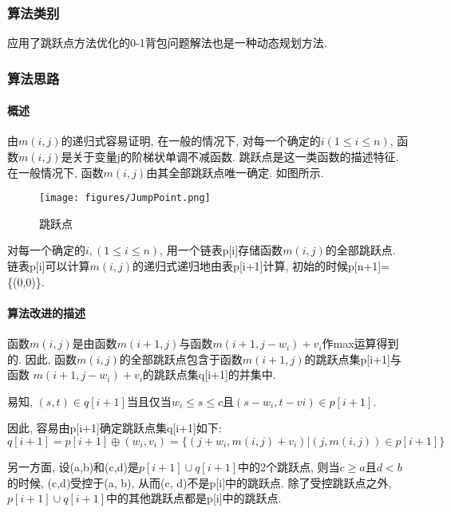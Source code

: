 \subsubsection{算法类别}
应用了跳跃点方法优化的0-1背包问题解法也是一种动态规划方法.

\subsubsection{算法思路}
\label{sec:jumpPointThink}
\paragraph{概述}
由$m(i, j)$的递归式容易证明, 在一般的情况下, 对每一个确定的$i(1\leq i\leq n)$,
函数$m(i, j)$是关于变量j的阶梯状单调不减函数. 跳跃点是这一类函数的描述特征.
在一般情况下, 函数$m(i, j)$由其全部跳跃点唯一确定. 如图所示.

\begin{figure}[ht!]
	\centering
	\texttt{[image: figures/JumpPoint.png]}
	\caption{跳跃点}
	\label{fig:JumpPoint}
\end{figure}

对每一个确定的$i,(1\leq i\leq n)$, 用一个链表p[i]存储函数$m(i,j)$的全部跳跃点.
链表p[i]可以计算$m(i,j)$的递归式递归地由表p[i+1]计算,
初始的时候p[n+1]=\{(0,0)\}.

\paragraph{算法改进的描述}
函数$m(i,j)$是由函数$m(i+1,j)$与函数$m(i+1, j-w_i)+v_i$作max运算得到的. 因此,
函数$m(i,j)$的全部跳跃点包含于函数$m(i+1,j)$的跳跃点集p[i+1]与函数
$m(i+1,j-w_i)+v_i$的跳跃点集q[i+1]的并集中.\par

易知, $(s,t)\in q[i+1]$当且仅当$w_i\leq s\leq c$且$(s-w_i,t-v{i})\in p[i+1]$. \par

因此, 容易由p[i+1]确定跳跃点集q[i+1]如下:
\begin{equation}
	q[i+1]=p[i+1]\oplus (w_i,v_i)=\{(j+w_i,m(i,j)+v_i)|(j,m(i,j))\in p[i+1]\}
	\label{eq:jumpSet}
\end{equation}

另一方面, 设(a,b)和(c,d)是$p[i+1]\cup q[i+1]$中的2个跳跃点, 则当$c\geq
	a$且$d<b$的时候, (c,d)受控于(a, b), 从而(c, d)不是p[i]中的跳跃点.
除了受控跳跃点之外, $p[i+1]\cup q[i+1]$中的其他跳跃点都是p[i]中的跳跃点.\par

